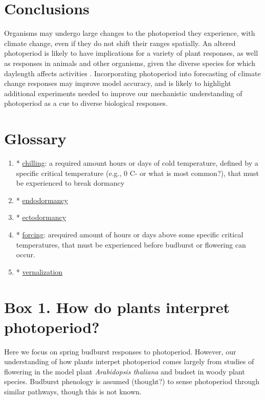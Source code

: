 \documentclass{article}
\begin{document}
\section*{Conclusions}
Organisms may undergo large changes to the photoperiod they experience, with climate change, even if they do not shift their ranges spatially. An altered photoperiod is likely to have implications for a variety of plant responses, as well as responses in animals and other organisms, given the diverse species for which daylength affects activities \citep[e.g.,][] {taranger2003,bradshaw2006,mcallan2006,linn1996,Flynn:2018,solbakken1994}. Incorporating photoperiod into forecasting of climate change responses may improve model accuracy, and is likely to highlight additional experiments needed to improve our mechanistic understanding of photoperiod as a cue to diverse biological responses. 
\section* {Glossary}
\begin{enumerate}
\item* \underline{chilling}: a required amount hours or days of cold temperature, defined by a specific critical temperature (e.g., 0 \degree C- or what is most common?), that must be experienced to break dormancy

\item* \underline{endodormancy}
\item* \underline{ectodormancy} 
\item* \underline{forcing}: arequired amount of hours or days above some specific critical temperatures, that must be experienced before budburst or flowering can occur.
\item* \underline{vernalization}
\end{enumerate}
\section{Box 1. How do plants interpret photoperiod? }
\par Here we focus on spring budburst responses to photoperiod. However, our understanding of how plants interpet photoperiod comes largely from studies of flowering in the model plant \emph{Arabidopsis thaliana} and budset in woody plant species. Budburst phenology is assumed (thought?) to sense photoperiod through similar pathways, though this is not known. 
\end{document}
